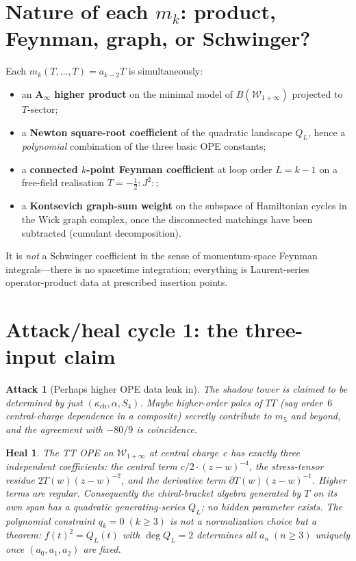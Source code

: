 \documentclass[11pt]{article}
\newtheorem{attack}{Attack}
\newtheorem*{heal}{Heal}
\newcommand{\kch}{\kappa_{\mathrm{ch}}}
\newcommand{\Winf}{\mathcal{W}_{1+\infty}}
\begin{document}
\section{Nature of each $m_k$: product, Feynman, graph, or Schwinger?}

Each $m_k(T,\ldots,T)=a_{k-2}T$ is simultaneously:
\begin{itemize}
\item an \textbf{A$_\infty$ higher product} on the minimal model of
$B(\Winf)$ projected to $T$-sector;
\item a \textbf{Newton square-root coefficient} of the quadratic
landscape $Q_L$, hence a \emph{polynomial} combination of the three
basic OPE constants;
\item a \textbf{connected $k$-point Feynman coefficient} at loop order
$L=k-1$ on a free-field realisation $T=-\tfrac12{:}J^2{:}$;
\item a \textbf{Kontsevich graph-sum weight} on the subspace of
Hamiltonian cycles in the Wick graph complex, once the disconnected
matchings have been subtracted (cumulant decomposition).
\end{itemize}
It is \emph{not} a Schwinger coefficient in the sense of
momentum-space Feynman integrals---there is no spacetime integration;
everything is Laurent-series operator-product data at prescribed
insertion points.

\section{Attack/heal cycle 1: the three-input claim}

\begin{attack}[Perhaps higher OPE data leak in]
The shadow tower is claimed to be determined by just
$(\kch,\alpha,S_4)$. Maybe higher-order poles of $TT$
(say order~$6$ central-charge dependence in a composite) secretly
contribute to $m_5$ and beyond, and the agreement with $-80/9$ is
coincidence.
\end{attack}

\begin{heal}
The TT OPE on $\Winf$ at central charge~$c$ has exactly three
independent coefficients: the central term $c/2\cdot(z-w)^{-4}$, the
stress-tensor residue $2T(w)(z-w)^{-2}$, and the derivative term
$\partial T(w)(z-w)^{-1}$. Higher terms are regular. Consequently the
chiral-bracket algebra generated by $T$ on its own span has a
quadratic generating-series $Q_L$; no hidden parameter exists.
The polynomial constraint $q_k=0\;(k\geq 3)$ is not a normalization
choice but a theorem: $f(t)^2=Q_L(t)$ with $\deg Q_L=2$ determines
all $a_n\;(n\geq 3)$ uniquely once $(a_0,a_1,a_2)$ are fixed.
\end{heal}
\end{document}
